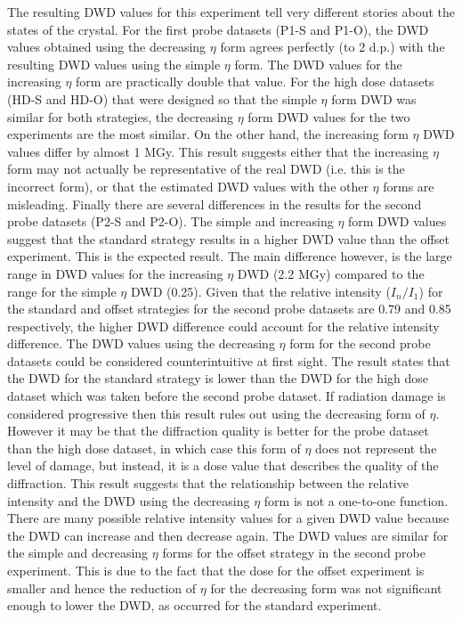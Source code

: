 The resulting DWD values for this experiment tell very different stories about the states of the crystal.
For the first probe datasets (P1-S and P1-O), the DWD values obtained using the decreasing $\eta$ form agrees perfectly (to 2 d.p.) with the resulting DWD values using the simple $\eta$ form.
The DWD values for the increasing $\eta$ form are practically double that value.
For the high dose datasets (HD-S and HD-O) that were designed so that the simple $\eta$ form DWD was similar for both strategies, the decreasing $\eta$ form DWD values for the two experiments are the most similar.
On the other hand, the increasing form $\eta$ DWD values differ by almost 1 MGy.
This result suggests either that the increasing $\eta$ form may not actually be representative of the real DWD (i.e. this is the incorrect form), or that the estimated DWD values with the other $\eta$ forms are misleading.
Finally there are several differences in the results for the second probe datasets (P2-S and P2-O).
The simple and increasing $\eta$ form DWD values suggest that the standard strategy results in a higher DWD value than the offset experiment.
This is the expected result.
The main difference however, is the large range in DWD values for the increasing $\eta$ DWD (2.2 MGy) compared to the range for the simple $\eta$ DWD (0.25).
Given that the relative intensity ($I_{n}/I_{1}$) for the standard and offset strategies for the second probe datasets are 0.79 and 0.85 respectively, the higher DWD difference could account for the relative intensity difference.
The DWD values using the decreasing $\eta$ form for the second probe datasets could be considered counterintuitive at first sight.
The result states that the DWD for the standard strategy is lower than the DWD for the high dose dataset which was taken before the second probe dataset.
If radiation damage is considered progressive then this result rules out using the decreasing form of $\eta$.
However it may be that the diffraction quality is better for the probe dataset than the high dose dataset, in which case this form of $\eta$ does not represent the level of damage, but instead, it is a dose value that describes the quality of the diffraction.
This result suggests that the relationship between the relative intensity and the DWD using the decreasing $\eta$ form is not a one-to-one function.
There are many possible relative intensity values for a given DWD value because the DWD can increase and then decrease again.
The DWD values are similar for the simple and decreasing $\eta$ forms for the offset strategy in the second probe experiment.
This is due to the fact that the dose for the offset experiment is smaller and hence the reduction of $\eta$ for the decreasing form was not significant enough to lower the DWD, as occurred for the standard experiment.
